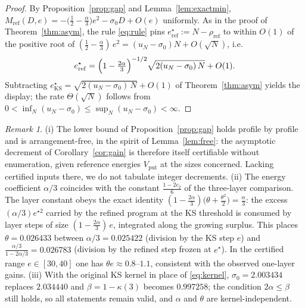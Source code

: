 \documentclass[11pt]{article}
\theoremstyle{remark}
\newtheorem{remark}{Remark}
\newcommand{\KS}{\mathrm{KS}}
\newcommand{\refi}{\mathrm{ref}}
\newcommand{\vput}{\mathrm{put}}
\begin{document}
\begin{proof}
By Proposition~\ref{prop:gap} and Lemma~\ref{lem:exactmin}, $M_\refi(D,e)=-\bigl(\tfrac12-\tfrac\alpha3\bigr)e^2-\sigma_0 D+O(e)$ uniformly. As in the proof of Theorem~\ref{thm:asym}, the rule \eqref{eq:rule} pins $e^\star_\refi:=N-\rho_\refi$ to within $O(1)$ of the positive root of $(\tfrac12-\tfrac\alpha3)\,e^2=(u_N-\sigma_0)N+O(\sqrt N)$, i.e.
\[
e^\star_\refi = \Bigl(1-\tfrac{2\alpha}3\Bigr)^{-1/2}\sqrt{2(u_N-\sigma_0)\,N} + O(1).
\]
Subtracting $e^\star_\KS=\sqrt{2(u_N-\sigma_0)\,N}+O(1)$ of Theorem~\ref{thm:asym} yields the display; the rate $\Theta(\sqrt N)$ follows from $0<\inf_N(u_N-\sigma_0)\le\sup_N(u_N-\sigma_0)<\infty$.
\end{proof}

\begin{remark}\label{rem:gain}
(i) The lower bound of Proposition~\ref{prop:gap} holds profile by profile and is arrangement-free, in the spirit of Lemma~\ref{lem:free}: the asymptotic decrement of Corollary~\ref{cor:gain} is therefore itself certifiable without enumeration, given reference energies $V_\vput$ at the sizes concerned. Lacking certified inputs there, we do not tabulate integer decrements.
(ii) The energy coefficient $\alpha/3$ coincides with the constant $\tfrac{1-2c_2}6$ of the three-layer comparison. The layer constant obeys the exact identity $(1-\tfrac{2\alpha}3)\bigl(\theta+\tfrac{\theta^2}2\bigr)=\tfrac\alpha3$: the excess $(\alpha/3)e^{\star2}$ carried by the refined program at the KS threshold is consumed by layer steps of size $(1-\tfrac{2\alpha}3)\,e$, integrated along the growing surplus. This places $\theta=0.026433$ between $\alpha/3=0.025422$ (division by the KS step $e$) and $\tfrac{\alpha/3}{1-2\alpha/3}=0.026783$ (division by the refined step frozen at $e^\star$). In the certified range $e\in[30,40]$ one has $\theta e\approx0.8$--$1.1$, consistent with the observed one-layer gains.
(iii) With the original KS kernel in place of \eqref{eq:kernel}, $\sigma_0=2.003434$ replaces $2.034440$ and $\beta=1-\kappa(3)$ becomes $0.997258$; the condition $2\alpha\le\beta$ still holds, so all statements remain valid, and $\alpha$ and $\theta$ are kernel-independent.
\end{remark}
\end{document}
